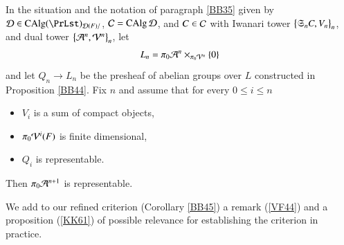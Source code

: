 \begin{ssCorollary}
\label{BB45}
In the situation and the notation of paragraph \ref{BB35} given by $\Dd \in \CAlg (\PrLst)_{\Dd(F)/}$, $\mathcal{C} = \operatorname{CAlg} \mathcal{D}$, and $C \in \mathcal{C}$ with Iwanari tower $\big\{\mathfrak{S}_n C, V_n \big\}_n$, and dual tower $\big\{\mathcal{A}^n, \mathcal{V}^n\big\}_n$, let
\[
L_n = \pi_0\mathcal{A}^n \times_{\pi_0 \mathcal{V}^n} \{0\}
\]
and let $Q_n \to L_n$ be the presheaf of abelian groups over $L$ constructed in Proposition \ref{BB44}. Fix $n$ and assume that for every $0 \le i \le n$
\begin{itemize}
\item[(a)]
$V_i$ is a sum of compact objects,
\item[(b)]
$\pi_0 \mathcal{V}^i(F)$ is finite dimensional,
\item[(c)]
$Q_i$ is representable.  
\end{itemize}
Then $\pi_0 \mathcal{A}^{n+1}$ is representable. 
\end{ssCorollary}

We add to our refined criterion (Corollary \ref{BB45}) a remark (\ref{VF44}) and a proposition (\ref{KK61}) of possible relevance for establishing the criterion in practice.  

